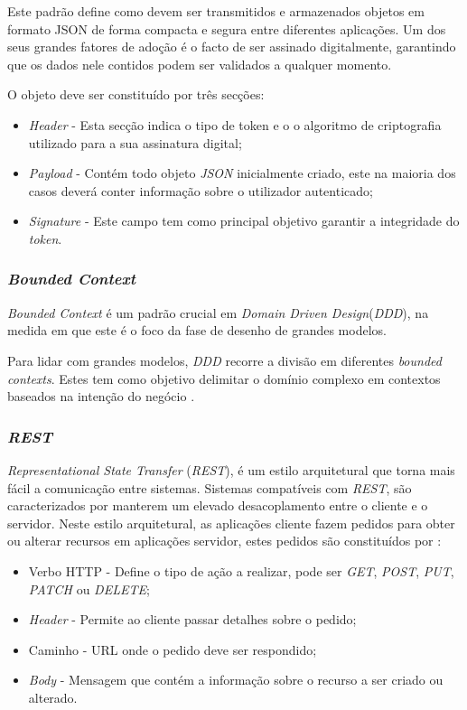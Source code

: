 Este padrão define como devem ser transmitidos e armazenados objetos em formato JSON de forma compacta e segura entre diferentes aplicações. Um dos seus grandes fatores de adoção é o facto de ser assinado digitalmente, garantindo que os dados nele contidos podem ser validados a qualquer momento\cite{jwt_medium}.

O objeto deve ser constituído por três secções:
\begin{itemize}
    \item \emph{Header} - Esta secção indica o tipo de token e o o algoritmo de criptografia utilizado para a sua assinatura digital;
    \item \emph{Payload} - Contém todo objeto \emph{JSON} inicialmente criado, este na maioria dos casos deverá conter informação sobre o utilizador autenticado;
    \item \emph{Signature} - Este campo tem como principal objetivo garantir a integridade do \emph{token}.
\end{itemize}

\subsubsection{\emph{Bounded Context}} \label{subsubsection:bounded:context}
\emph{Bounded Context} é um padrão crucial em \emph{Domain Driven Design}(\emph{DDD}\label{sym:DDD}), na medida em que este é o foco da fase de desenho de grandes modelos.

Para lidar com grandes modelos, \emph{DDD} recorre a divisão em diferentes \emph{bounded contexts}. Estes tem como objetivo delimitar o domínio complexo em contextos baseados na intenção do negócio \cite{bounded_context}.

\subsubsection{\emph{REST}}
\emph{Representational State Transfer} (\emph{REST}\label{sym:REST}), é um estilo arquitetural que torna mais fácil a comunicação entre sistemas. Sistemas compatíveis com \emph{REST}, são caracterizados por manterem um elevado desacoplamento entre o cliente e o servidor.
Neste estilo arquitetural, as aplicações cliente fazem pedidos para obter ou alterar recursos em aplicações servidor, estes pedidos são constituídos por \cite{rest}:
\begin{itemize}
    \item Verbo HTTP - Define o tipo de ação a realizar, pode ser \emph{GET}, \emph{POST}, \emph{PUT}, \emph{PATCH} ou \emph{DELETE};
    \item \emph{Header} - Permite ao cliente passar detalhes sobre o pedido;
    \item Caminho - URL onde o pedido deve ser respondido;
    \item \emph{Body} - Mensagem que contém a informação sobre o recurso a ser criado ou alterado.
\end{itemize}

